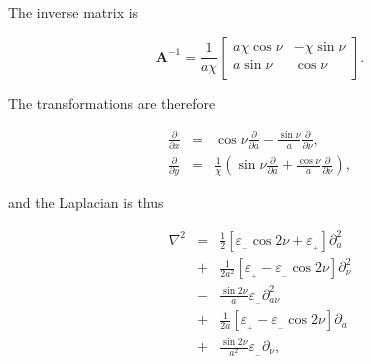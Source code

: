 \documentclass[apj]{emulateapj}
\newcommand{\pderiv}[2]{\frac{\partial #1}{\partial #2}}
\newcommand{\pderivn}[3]{\frac{\partial^{#3} #1}{\partial #2^{#3}}}
\newcommand{\vt}[1]{\mathbf{#1}}       %
\newcommand{\Laplace}{\nabla^2}
\newcommand{\beq}{\begin{equation}}
\newcommand{\eeq}{\end{equation}}
\newcommand{\beqn}{\begin{eqnarray}}
\newcommand{\eeqn}{\end{eqnarray}}
\newcommand{\epsp}{\varepsilon_{_{+}}}
\newcommand{\epsm}{\varepsilon_{_{-}}}
\begin{document}
\noindent The inverse matrix is 

\beq
\vt{A}^{-1} = \frac{1}{a\chi} \left[\begin{array}{cc}
a\chi\cos\nu  & -\chi\sin\nu  \\
a\sin\nu  & \cos\nu \\
\end{array}\right].  
\eeq

The transformations are therefore

\beqn
\pderiv{}{x} &=& \cos\nu \pderiv{}{a} - \frac{\sin\nu}{a} \pderiv{}{\nu}, \\
\pderiv{}{y} &=& \frac{1}{\chi}\left(\sin\nu \pderiv{}{a} + \frac{\cos\nu}{a} \pderiv{}{\nu} \right),
\eeqn




\noindent and the Laplacian is thus 

\beqn
\Laplace{} &= &\frac{1}{2}\left[ \epsm \cos 2\nu +  \epsp\right] \partial^2_a  \nonumber \\
                &+& \frac{1}{2a^2}\left[ \epsp - \epsm \cos 2\nu\right] \partial^2_\nu \nonumber \\
                &-& \frac{\sin 2\nu}{a}\epsm \partial^2_{a\nu}   \nonumber \\
                &+& \frac{1}{2a}\left[ \epsp - \epsm \cos 2\nu\right] \partial_a \nonumber \\
                &+& \frac{\sin 2\nu}{a^2} \epsm\partial_\nu, \label{eq:laplace}
\eeqn
\end{document}
